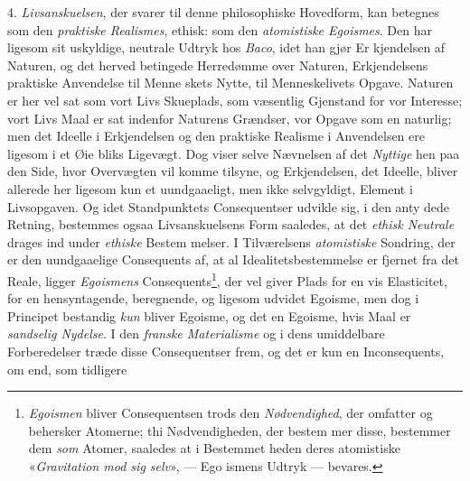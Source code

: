  \setcounter{footnote}{0}
4. \emph{Livsanskuelsen}, der svarer til denne philosophiske
Hovedform, kan betegnes som den \emph{praktiske Realismes},
ethisk: som den \emph{atomistiske Egoismes}. Den har ligesom
sit uskyldige, neutrale Udtryk hos \emph{Baco}, idet han gjør Er\-%
kjendelsen af Naturen, og det herved betingede Herredømme
over Naturen, Erkjendelsens praktiske Anvendelse til Menne\-%
skets Nytte, til Menneskelivets Opgave. Naturen er her vel
sat som vort Livs Skueplads, som væsentlig Gjenstand for vor
Interesse; vort Livs Maal er sat indenfor Naturens Grændser,
vor Opgave som en naturlig; men det Ideelle i Erkjendelsen
og den praktiske Realisme i Anvendelsen ere ligesom i et Øie\-%
bliks Ligevægt. Dog viser selve Nævnelsen af det \emph{Nyttige}
hen paa den Side, hvor Overvægten vil komme tilsyne, og
Erkjendelsen, det Ideelle, bliver allerede her ligesom kun et
uundgaaeligt, men ikke selvgyldigt, Element i Livsopgaven.
Og idet Standpunktets Consequentser udvikle sig, i den anty\-%
dede Retning, bestemmes ogsaa Livsanskuelsens Form saaledes,
at det \emph{ethisk Neutrale} drages ind under \emph{ethiske} Bestem\-%
melser. I Tilværelsens \emph{atomistiske} Sondring, der er den
uundgaaelige Consequents af, at al Idealitetsbestemmelse er
fjernet fra det Reale, ligger \emph{Egoismens} Consequents\footnote{\emph{Egoismen} bliver Consequentsen trods den \emph{Nødvendighed}, der
omfatter og behersker Atomerne; thi Nødvendigheden, der bestem\-%
mer disse, bestemmer dem \emph{som} Atomer, saaledes at i Bestemmet\-%
heden deres atomistiske «\emph{Gravitation mod sig selv}», --- Ego\-%
ismens Udtryk --- bevares.}, der
vel giver Plads for en vis Elasticitet, for en hensyntagende,
beregnende, og ligesom udvidet Egoisme, men dog i Principet
bestandig \emph{kun} bliver Egoisme, og det en Egoisme, hvis Maal
er \emph{sandselig Nydelse}. I den \emph{franske Materialisme} og
 i dens umiddelbare Forberedelser træde disse Consequentser
frem, og det er kun en Inconsequents, om end, som tidligere
